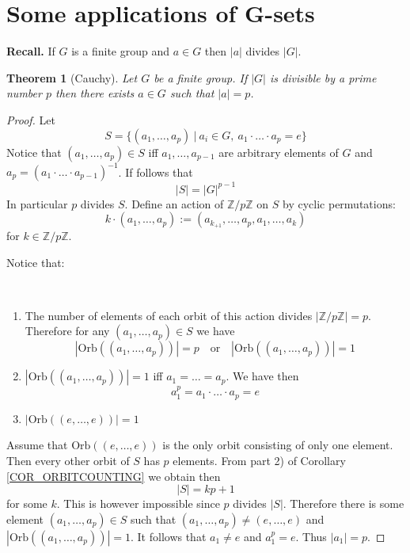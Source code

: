 \documentclass[12pt, letterpaper, oneside]{article}
\theoremstyle{plain}
\newtheorem{theorem}{Theorem}[section]
\theoremstyle{definition}
\newcommand{\Z}{{\mathbb Z}}
\newcommand{\Orb}{\mathrm{Orb}}
\newcommand{\benu}{\begin{enumerate}}
\newcommand{\eenu}{\end{enumerate}}
\begin{document}


\newpage
\section{Some applications of $\mathbf{G}$-sets}
\label{SEC_APPSGSETS}


\textbf{Recall.} If $G$ is a finite group and $a\in G$ then $|a|$ divides $|G|$.

\begin{theorem}[Cauchy]
\label{THM_CAUCHY}
Let $G$ be a finite group. If  $|G|$ is divisible by a prime number $p$ then there exists 
$a\in G$ such that $|a|= p$.
\end{theorem}

\begin{proof}
Let 
$$S = \{ (a_{1}, \dots,  a_{p}) \ | \ a_{i}\in G, \ a_{1}\cdot{\dots}\cdot a_{p} = e \}$$
Notice that $(a_{1}, \dots, a_{p}) \in S$ iff $a_{1}, \dots, a_{p-1}$ are arbitrary elements 
of $G$ and $a_{p} = (a_{1}\cdot {\dots}\cdot a_{p-1})^{-1}$. If follows that 
$$|S| = |G|^{p-1}$$
In particular $p$ divides $S$. 
Define an action of $\Z/p\Z$ on $S$ by cyclic permutations:
$$k\cdot (a_{1}, \dots, a_{p}) := (a_{k_{+1}},\dots, a_{p}, a_{1}, \dots, a_{k})$$ 
for $k\in \Z/p\Z$.

Notice that: 

\vskip -13mm

\ 
\benu
\item The number of elements of each orbit of this action divides $|\Z/p\Z| = p$. 
Therefore for any $(a_{1}, \dots, a_{p})\in S$ we have
$$|\Orb((a_{1}, \dots, a_{p}))| = p \ \ \ \text{ or } \ \ \ |\Orb((a_{1}, \dots, a_{p}))| =1$$
\item $|\Orb((a_{1}, \dots, a_{p}))| =1$ iff $a_{1}  = \dots = a_{p}$. We have then 
$$a_{1}^{p} = a_{1}\cdot {\dots} \cdot a_{p} = e$$ 
\item $|\Orb((e, \dots, e ))|=1$
\eenu
Assume that $\Orb((e, \dots, e))$ is the only orbit consisting of only one element.  Then 
every other orbit of $S$ has $p$ elements. From part 2) of Corollary \ref{COR_ORBITCOUNTING}
we obtain then
$$|S| = kp +1$$
for some $k$. This is however impossible since $p$ divides $|S|$. Therefore  there is some 
element $(a_{1}, \dots, a_{p})\in S$ such that $(a_{1}, \dots, a_{p})\neq (e, \dots, e)$
and $|\Orb((a_{1}, \dots, a_{p}))| =1$.  It follows that $a_{1}\neq e$ and $a_{1}^{p} = e$. 
Thus  $|a_{1}| = p$.
\end{proof}
\end{document}
